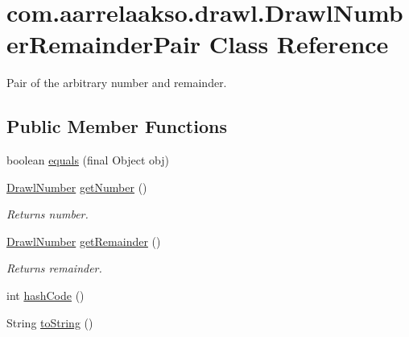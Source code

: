 \hypertarget{classcom_1_1aarrelaakso_1_1drawl_1_1_drawl_number_remainder_pair}{}\section{com.\+aarrelaakso.\+drawl.\+Drawl\+Number\+Remainder\+Pair Class Reference}
\label{classcom_1_1aarrelaakso_1_1drawl_1_1_drawl_number_remainder_pair}


Pair of the arbitrary number and remainder.  


\subsection*{Public Member Functions}
\begin{DoxyCompactItemize}
\item 
boolean \hyperlink{classcom_1_1aarrelaakso_1_1drawl_1_1_drawl_number_remainder_pair_a8f64c3bb4f744e869d5021db87c577fd}{equals} (final Object obj)
\item 
\hyperlink{classcom_1_1aarrelaakso_1_1drawl_1_1_drawl_number}{Drawl\+Number} \hyperlink{classcom_1_1aarrelaakso_1_1drawl_1_1_drawl_number_remainder_pair_a0924839905a2c81b8bd4b2fd749e9783}{get\+Number} ()
\begin{DoxyCompactList}\small\item\em Returns number. \end{DoxyCompactList}\item 
\hyperlink{classcom_1_1aarrelaakso_1_1drawl_1_1_drawl_number}{Drawl\+Number} \hyperlink{classcom_1_1aarrelaakso_1_1drawl_1_1_drawl_number_remainder_pair_a1d30d70c9111a226e4dbf599139c7096}{get\+Remainder} ()
\begin{DoxyCompactList}\small\item\em Returns remainder. \end{DoxyCompactList}\item 
int \hyperlink{classcom_1_1aarrelaakso_1_1drawl_1_1_drawl_number_remainder_pair_aa56a76d72bd049756ea037819a8163fa}{hash\+Code} ()
\item 
String \hyperlink{classcom_1_1aarrelaakso_1_1drawl_1_1_drawl_number_remainder_pair_a4e2f7077149f0a6f6f4b66bb76a3feb0}{to\+String} ()
\end{DoxyCompactItemize}
